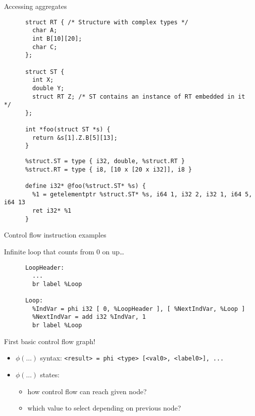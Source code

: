 \documentclass[8pt]{beamer}
\begin{document}
\begin{frame}[fragile]{Accessing aggregates}
  \begin{exampleblock}{}
    \begin{verbatim}
      struct RT { /* Structure with complex types */
        char A;
        int B[10][20];
        char C;
      };

      struct ST {
        int X;
        double Y;
        struct RT Z; /* ST contains an instance of RT embedded in it */
      };

      int *foo(struct ST *s) {
        return &s[1].Z.B[5][13];
      }
    \end{verbatim}
  \end{exampleblock}
  
  \begin{exampleblock}{}
    \begin{verbatim}
      %struct.ST = type { i32, double, %struct.RT }
      %struct.RT = type { i8, [10 x [20 x i32]], i8 }

      define i32* @foo(%struct.ST* %s) {
        %1 = getelementptr %struct.ST* %s, i64 1, i32 2, i32 1, i64 5, i64 13
        ret i32* %1
      }
    \end{verbatim}
  \end{exampleblock}
\end{frame}

\begin{frame}[fragile]{Control flow instruction examples}
  \begin{exampleblock}{Infinite loop that counts from 0 on up\ldots}
    \begin{verbatim}
      LoopHeader:
        ...
        br label %Loop

      Loop:
        %IndVar = phi i32 [ 0, %LoopHeader ], [ %NextIndVar, %Loop ]
        %NextIndVar = add i32 %IndVar, 1
        br label %Loop
    \end{verbatim}
  \end{exampleblock}

  \begin{block}{First basic control flow graph!}
    \begin{itemize}
      \item $\phi(\ldots)$ syntax: \verb+<result> = phi <type> [<val0>, <label0>], ...+
      \item $\phi(\ldots)$ states:
        \begin{itemize}
          \item how control flow can reach given node?
          \item which value to select depending on previous node?
        \end{itemize}
    \end{itemize}
  \end{block}
\end{frame}
\end{document}
